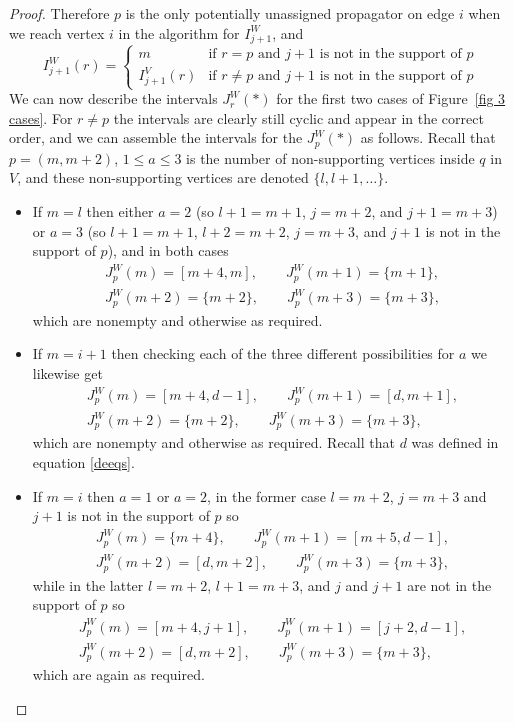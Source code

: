 \documentclass[11pt]{article}
\theoremstyle{remark}
\theoremstyle{definition}
\begin{document}
\begin{proof}
Therefore $p$ is the only potentially unassigned propagator on edge $i$ when we reach vertex $i$ in the algorithm for $I_{j+1}^W$, and
    \[
    I_{j+1}^{W}(r)  = \begin{cases}
      m & \text{if  $r=p$ and $j+1$ is not in the support of $p$}\\
      I_{j+1}^{V}(r) & \text{if  $r\neq p$ and $j+1$ is not in the support of $p$}
    \end{cases}
    \]
We can now describe the intervals $J^{W}_r(*)$ for the first two cases of Figure~\ref{fig 3 cases}. For $r \neq p$ the intervals are clearly still cyclic and appear in the correct order, and we can assemble the intervals for the $J_p^{W}(*)$ as follows. Recall that $p = (m,m+2)$, $1 \leq a \leq 3$ is the number of non-supporting vertices inside $q$ in $V$, and these non-supporting vertices are denoted $\{l,l+1, \dots\}$. 
    \begin{itemize}
      \item 
    If $m=l$ then either $a=2$ (so $l+1=m+1$, $j=m+2$, and $j+1=m+3$) or $a=3$ (so $l+1=m+1$, $l+2=m+2$, $j=m+3$, and $j+1$ is not in the support of $p$), and in both cases
    \begin{gather*}
    J^{W}_p(m) = [m+4, m], \qquad  J^{W}_p(m+1) = \{m+1\}, \\ J^{W}_p(m+2) = \{m+2\}, \qquad  J^{W}_p(m+3) = \{m+3\},
    \end{gather*}
    which are nonempty and otherwise as required.
  \item
        If $m=i+1$ then checking each of the three different possibilities for $a$ we likewise get
    \begin{gather*}
    J^{W}_p(m) = [m+4, d-1], \qquad  J^{W}_p(m+1) = [d, m+1], \\  J^{W}_p(m+2) = \{m+2\}, \qquad  J^{W}_p(m+3) = \{m+3\},
    \end{gather*}
    which are nonempty and otherwise as required. Recall that $d$ was defined in equation \eqref{deeqs}.
  \item If $m=i$ then $a=1$ or $a=2$, in the former case $l=m+2$, $j=m+3$ and $j+1$ is not in the support of $p$ so
    \begin{gather*}
    J^{W}_p(m) = \{m+4\}, \qquad  J^{W}_p(m+1) = [m+5, d-1], \\  J^{W}_p(m+2) = [d, m+2], \qquad  J^{W}_p(m+3) = \{m+3\},
    \end{gather*}
    while in the latter $l=m+2$, $l+1=m+3$, and $j$ and $j+1$ are not in the support of $p$ so
    \begin{gather*}
    J^{W}_p(m) = [m+4, j+1], \qquad  J^{W}_p(m+1) = [j+2, d-1], \\  J^{W}_p(m+2) = [d, m+2], \qquad  J^{W}_p(m+3) = \{m+3\},
    \end{gather*}
    which are again as required.
    \end{itemize}


\end{proof}
\end{document}
